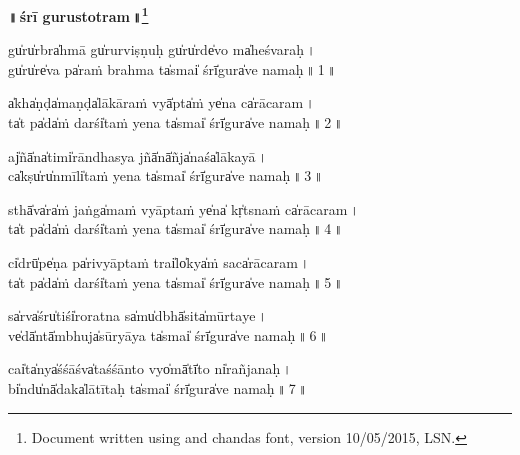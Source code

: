\documentclass[parskip, DIV=14]{scrartcl}
\renewcommand{\thefootnote}{\fnsymbol{footnote}} %
\begin{document}

\vspace{-1.5cm}

\pagestyle{fancy}



\begin{center}
\textbf{{\Huge॥\,śrī gu॒rustotra॒m\,॥\LARGE\let\thefootnote\relax\footnote{\color{lightgray} Document written using \XeLaTeX{} and chandas font, version 10/05/2015, LSN.}}}
\end{center}
\Large

\centering	

\vspace{0.5cm}

gu̍ru̍rbra̍hmā gu̍rurvi॒ṣṇuḥ gu̍ru̍rde̍vo ma̍heśva॒ra॒ḥ\,। \\
gu̍ru̍re̍va pa̍raṁ bra॒hma ta̍smai̍ śrī̍gura̍ve na॒ma॒ḥ॒\,॥\,1\,॥ \par 

a̍kha̍ṇḍa̍maṇḍa̍lākā॒raṁ vyā̍pta̍ṁ ye̍na ca̍rāca॒ra॒m\,। \\
ta̍t pa̍da̍ṁ darśi̍taṁ ye॒na  ta̍smai̍ śrī̍gura̍ve na॒ma॒ḥ॒\,॥\,2\,॥ \par 
 
aj̍ñā̍na̍timi̍rāndha॒sya jñā̍nā̍ñja̍naśa̍lāka॒yā॒\,। \\
ca̍kṣu̍ru̍nmīli̍taṁ ye॒na  ta̍smai̍ śrī̍gura̍ve na॒ma॒ḥ॒\,॥\,3\,॥ \par 

sthā̍va̍ra̍ṁ jaṅga̍maṁ vyā॒ptaṁ ye̍na̍ kṛ̍tsnaṁ ca̍rāca॒ra॒m\,। \\
ta̍t pa̍da̍ṁ darśi̍taṁ ye॒na  ta̍smai̍ śrī̍gura̍ve na॒ma॒ḥ॒\,॥\,4\,॥ \par 
 
ci̍drū̍pe̍ṇa pa̍rivyā॒ptaṁ trai̍lo̍kya̍ṁ saca̍rāca॒ra॒m\,। \\
ta̍t pa̍da̍ṁ darśi̍taṁ ye॒na  ta̍smai̍ śrī̍gura̍ve na॒ma॒ḥ॒\,॥\,5\,॥ \par 
 
sa̍rva̍śru̍tiśi̍rora॒tna sa̍mu̍dbhā̍sita̍mūrta॒ye॒\,। \\
ve̍dā̍ntā̍mbhuja̍sūryā॒ya  ta̍smai̍ śrī̍gura̍ve na॒ma॒ḥ॒\,॥\,6\,॥ \par 
 
cai̍ta̍nya̍śśāśva̍taśśā॒nto vyo̍mā̍tī̍to ni̍rañja॒na॒ḥ\,। \\
bi̍ndu̍nā̍daka̍lātī॒taḥ  ta̍smai̍ śrī̍gura̍ve na॒ma॒ḥ॒\,॥\,7\,॥ \par 
 
\end{document}
